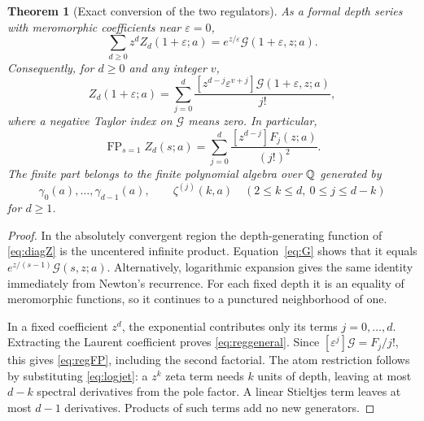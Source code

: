 \documentclass[11pt]{article}
\numberwithin{equation}{section}
\newtheorem{theorem}{Theorem}[section]
\theoremstyle{definition}\newtheorem{definition}[theorem]{Definition}
\theoremstyle{remark}\newtheorem{remark}[theorem]{Remark}
\DeclareMathOperator{\FP}{FP}
\newcommand{\G}{\mathcal G}\newcommand{\F}{\mathfrak F}
\newcommand{\eps}{\varepsilon}
\begin{document}
\begin{theorem}[Exact conversion of the two regulators]
\label{thm:regulator}
As a formal depth series with meromorphic coefficients near $\eps=0$,
\begin{equation}
 \sum_{d\ge0}z^d Z_d(1+\eps;a)
       =e^{z/\eps}\G(1+\eps,z;a).
 \label{eq:regmaster}
\end{equation}
Consequently, for $d\ge0$ and any integer $v$,
\begin{equation}
 [\eps^v]Z_d(1+\eps;a)
   =\sum_{j=0}^d\frac{[z^{d-j}\eps^{v+j}]\G(1+\eps,z;a)}{j!},
 \label{eq:reggeneral}
\end{equation}
where a negative Taylor index on $\G$ means zero. In particular,
\begin{equation}
 \boxed{\FP_{s=1}Z_d(s;a)=
       \sum_{j=0}^d\frac{[z^{d-j}]F_j(z;a)}{(j!)^2}}.
 \label{eq:regFP}
\end{equation}
The finite part belongs to the finite polynomial algebra over $\mathbb Q$
generated by
\begin{equation}
 \gamma_0(a),\ldots,\gamma_{d-1}(a),\qquad
 \zeta^{(j)}(k,a)\quad(2\le k\le d,\ 0\le j\le d-k)
 \label{eq:FPatoms}
\end{equation}
for $d\ge1$.
\end{theorem}
\begin{proof}
In the absolutely convergent region the depth-generating function of
\eqref{eq:diagZ} is the uncentered infinite product. Equation~\eqref{eq:G}
shows that it equals $e^{z/(s-1)}\G(s,z;a)$. Alternatively, logarithmic
expansion gives the same identity immediately from Newton's recurrence.
For each fixed depth it is an equality of meromorphic functions, so it
continues to a punctured neighborhood of one.

In a fixed coefficient $z^d$, the exponential contributes only its terms
$j=0,\ldots,d$. Extracting the Laurent coefficient proves
\eqref{eq:reggeneral}. Since $[\eps^j]\G=F_j/j!$, this gives
\eqref{eq:regFP}, including the second factorial. The atom restriction
follows by substituting \eqref{eq:logjet}: a $z^k$ zeta term needs $k$
units of depth, leaving at most $d-k$ spectral derivatives from the pole
factor. A linear Stieltjes term leaves at most $d-1$ derivatives. Products
of such terms add no new generators.
\end{proof}
\end{document}
